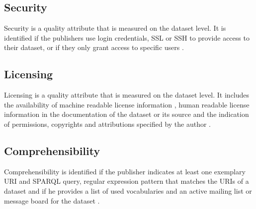 \documentclass[onecolumn, crcready]{iosart2c}
\begin{document}
\subsection{Security}

Security is a quality attribute that is measured on the dataset level. It is identified if the publishers use login credentials, SSL or SSH to provide access to their dataset, or if they only grant access to specific users \cite{Framework2012}.

\subsection{Licensing}

Licensing is a quality attribute that is measured on the dataset level. It includes the availability of machine readable license information \cite{Hogan:2012:ESL:2263498.2264570}, human readable license information in the documentation of the dataset or its source \cite{Hogan:2012:ESL:2263498.2264570} and the indication of permissions, copyrights and attributions specified by the author \cite{Framework2012}.

\subsection{Comprehensibility}

Comprehensibility is identified if the publisher indicates at least one exemplary URI and SPARQL query, regular expression pattern that matches the URIs of a dataset \cite{Framework2012} and if he provides a list of used vocabularies and an active mailing list or message board for the dataset \cite{flemming2010}. 
\end{document}
